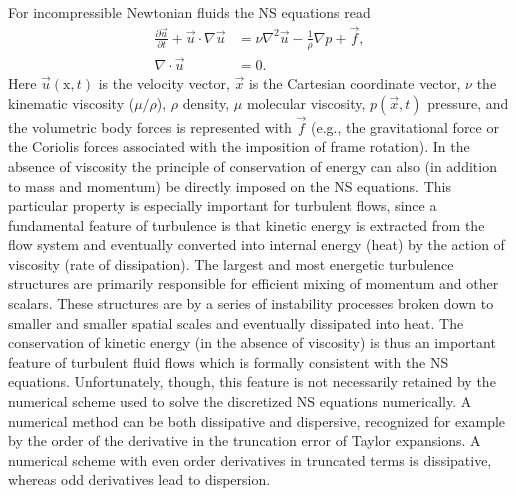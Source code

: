 For incompressible Newtonian fluids the NS equations read
\begin{align}
 \frac{\partial \vec{u}}{\partial t}+\vec{u}\cdot \nabla \vec{u} &= \nu \nabla^2 \vec{u} -\frac{1}{\rho} \nabla p +\vec{f}, \label{eq:mortensen:NS}\\
 \nabla \cdot \vec{u} &=0.
 \label{eq:mortensen:cont}
\end{align}
Here $\vec{u}(\text{x},t)$ is the velocity vector, $\vec{x}$ is the Cartesian coordinate vector, $\nu$ the kinematic
viscosity ($\mu/\rho$), $\rho$ density, $\mu$ molecular viscosity, $p(\vec{x},t)$ pressure, and the volumetric body forces is represented with $\vec{f}$ (e.g., the gravitational force or the Coriolis forces associated with the imposition of frame rotation). In the absence of viscosity the principle of conservation of energy can also (in addition to mass and momentum) be directly imposed on the NS equations. This particular property is especially important for turbulent flows, since a fundamental feature of turbulence is that kinetic energy is extracted from the flow system and eventually converted into internal energy (heat) by the action of viscosity (rate of dissipation). The largest and most energetic turbulence structures are primarily responsible for efficient mixing of momentum and other scalars. These structures are by a series of instability processes broken down to smaller and smaller spatial scales and eventually dissipated into heat. The conservation of kinetic energy (in the absence of viscosity) is thus an important feature of turbulent fluid flows which is formally consistent with the NS equations. Unfortunately, though, this feature is not necessarily retained by the numerical scheme used to solve the discretized NS equations numerically. A numerical method can be both dissipative and dispersive, recognized for example by the order of the derivative in the truncation error of Taylor expansions. A numerical scheme with even order derivatives in truncated terms is dissipative, whereas odd derivatives lead to dispersion.
